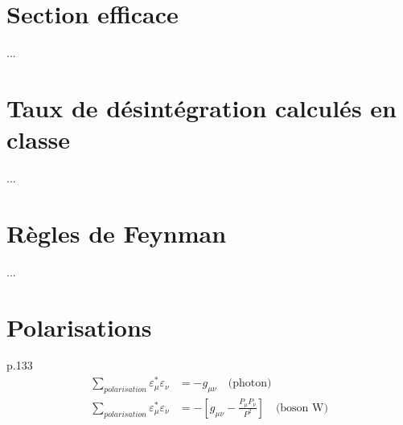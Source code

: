 \documentclass[12pt]{article}
\begin{document}
\section{Section efficace}
...

\section{Taux de désintégration calculés en classe}
...

\section{Règles de Feynman}
...

\section{Polarisations}
p.133 \\
\begin{align}
  \sum_{polarisation} \varepsilon_\mu^*\varepsilon_\nu &= - g_{\mu\nu} \quad \text{(photon)}\\
  \sum_{polarisation} \varepsilon_\mu^*\varepsilon_\nu &= - \left[g_{\mu\nu}- \frac{P_\mu P_\nu}{P^2}\right] \quad \text{(boson W)}
\end{align}
\end{document}
